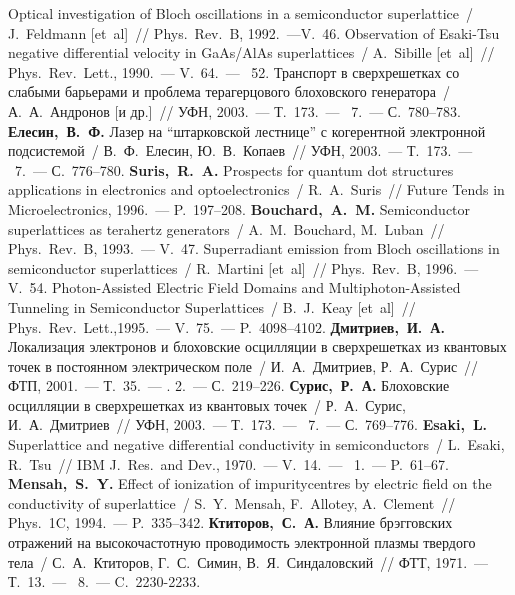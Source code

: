 \begin{thebibliography}{99}
       Optical investigation of Bloch oscillations in a semiconductor superlattice~/ J.~Feldmann [et~al]~// Phys.~Rev.~B, 1992.~---V.~46.
     Observation of Esaki-Tsu negative differential velocity in GaAs/AlAs superlattices~/ A.~Sibille [et~al]~// Phys.~Rev.~Lett., 1990.~--- V.~64.~--- \No~52.
      Транспорт в сверхрешетках со слабыми барьерами и проблема терагерцового блоховского генератора~/  А.~А.~Андронов [и др.]~// УФН, 2003.~--- Т.~173.~--- \No~7.~--- С.~780--783.
     \textbf{Елесин,~В.~Ф.} Лазер на ``штарковской лестнице'' с когерентной электронной подсистемой~/ В.~Ф.~Елесин, Ю.~В.~Копаев~// УФН, 2003.~--- Т.~173.~--- \No~7.~--- С.~776--780.
       \textbf{Suris,~R.~A.} Prospects for quantum dot structures applications in electronics and optoelectronics~/ R.~A.~Suris~// Future Tends in Microelectronics, 1996.~--- P.~197--208.
     \textbf{Bouchard,~A.~M.} Semiconductor superlattices as terahertz generators~/ A.~M.~Bouchard, M.~Luban~// Phys.~Rev.~B, 1993.~--- V.~47.
     Superradiant emission from Bloch oscillations in semiconductor superlattices~/ R.~Martini [et~al]~// Phys.~Rev.~B, 1996.~--- V.~54.
     Photon-Assisted Electric Field Domains and Multiphoton-Assisted Tunneling in Semiconductor Superlattices~/ B.~J.~Keay [et~al]~// Phys.~Rev.~Lett.,1995.~--- V.~75.~--- P.~4098--4102.
       \textbf{Дмитриев,~И.~А.} Локализация электронов и блоховские осцилляции в сверхрешетках из квантовых точек в постоянном электрическом поле~/ И.~А.~Дмитриев, Р.~А.~Сурис~// ФТП, 2001.~--- Т.~35.~--- \No. 2.~--- С.~219--226.
     \textbf{Сурис,~Р.~А.} Блоховские осцилляции в сверхрешетках из квантовых точек~/ Р.~А.~Сурис, И.~А.~Дмитриев~// УФН, 2003.~--- Т.~173.~--- \No~7.~--- С.~769--776.
      \textbf{Esaki,~L.} Superlattice and negative differential conductivity in semiconductors~/ L.~Esaki, R.~Tsu~// IBM J.~Res.~and Dev., 1970.~--- V.~14.~--- \No~1.~--- P.~61--67.
     \textbf{Mensah,~S.~Y.} Effect of ionization of impuritycentres by electric field on the conductivity of superlattice~/ S.~Y.~Mensah, F.~Allotey, A.~Clement~// Phys.~1C, 1994.~--- P.~335--342.
       \textbf{Ктиторов,~С.~А.} Влияние брэгговских отражений на высокочастотную проводимость электронной плазмы твердого тела~/ С.~А.~Ктиторов, Г.~С.~Симин, В.~Я.~Синдаловский~// ФТТ, 1971.~--- Т.~13.~--- \No~8.~--- C.~2230-2233.

\end{thebibliography}
